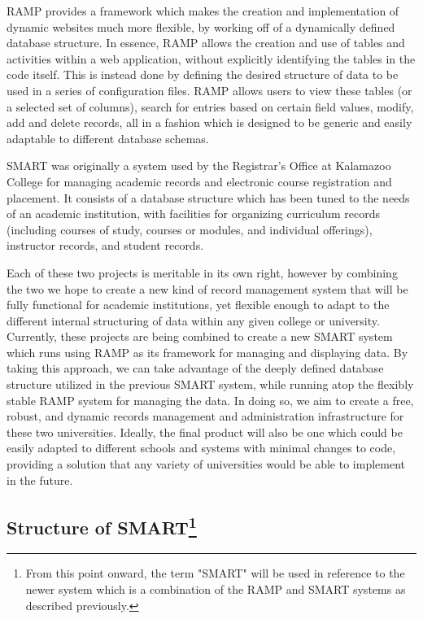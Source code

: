 \documentclass[12pt]{article}
\begin{document}
RAMP provides a framework which makes the creation and implementation of dynamic websites much more flexible, by working off of a dynamically defined database structure. In essence, RAMP allows the creation and use of tables and activities within a web application, without explicitly identifying the tables in the code itself. This is instead done by defining the desired structure of data to be used in a series of configuration files. RAMP allows users to view these tables (or a selected set of columns), search for entries based on certain field values, modify, add and delete records, all in a fashion which is designed to be generic and easily adaptable to different database schemas.

SMART was originally a system used by the Registrar’s Office at Kalamazoo College for managing academic records and electronic course registration and placement. It consists of a database structure which has been tuned to the needs of an academic institution, with facilities for organizing curriculum records (including courses of study, courses or modules, and individual offerings), instructor records, and student records.

Each of these two projects is meritable in its own right, however by combining the two we hope to create a new kind of record management system that will be fully functional for academic institutions, yet flexible enough to adapt to the different internal structuring of data within any given college or university. Currently, these projects are being combined to create a new SMART system which runs using RAMP as its framework for managing and displaying data. By taking this approach, we can take advantage of the deeply defined database structure utilized in the previous SMART system, while running atop the flexibly stable RAMP system for managing the data. In doing so, we aim to create a free, robust, and dynamic records management and administration infrastructure for these two universities. Ideally, the final product will also be one which could be easily adapted to different schools and systems with minimal changes to code, providing a solution that any variety of universities would be able to implement in the future.

\subsection[Structure of SMART]{Structure of SMART\footnote{From this point onward, the term "SMART" will be used in reference to the newer system which is a combination of the RAMP and SMART systems as described previously.}}
\end{document}
